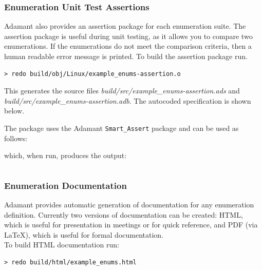 \subsubsection{Enumeration Unit Test Assertions}

Adamant also provides an assertion package for each enumeration suite. The assertion package is useful during unit testing, as it allows you to compare two enumerations. If the enumerations do not meet the comparison criteria, then a human readable error message is printed. To build the assertion package run.

\vspace{5mm} %
\begin{verbatim}
> redo build/obj/Linux/example_enums-assertion.o
\end{verbatim}
\vspace{5mm} %

This generates the source files \textit{build/src/example\_enums-assertion.ads} and \textit{build/src/example\_enums-assertion.adb}. The autocoded specification is shown below.


The package uses the Adamant \texttt{Smart\_Assert} package and can be used as follows:


which, when run, produces the output:

\vspace{5mm} %
\inputminted{text}{../example_architecture/enum_assertion/output.txt}
\vspace{5mm} %

\subsubsection{Enumeration Documentation}

Adamant provides automatic generation of documentation for any enumeration definition. Currently two versions of documentation can be created: HTML, which is useful for presentation in meetings or for quick reference, and PDF (via \LaTeX), which is useful for formal documentation.\\

To build HTML documentation run:

\vspace{5mm} %
\begin{verbatim}
> redo build/html/example_enums.html
\end{verbatim}
\vspace{5mm} %

